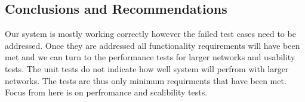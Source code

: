 \documentclass[hidelinks,a4paper,12pt]{article}
\begin{document}
\subsection{Conclusions and Recommendations}
Our system is mostly working correctly however the failed test cases need to be addressed. Once they are addressed all functionality requirements will have been met and we can turn to the performance tests for larger networks and usability tests. The unit tests do not indicate how well system will perfrom with larger networks. The tests are thus only minimum requirments that have been met.  Focus from here is on perfromance and scalibility tests.
\end{document}
